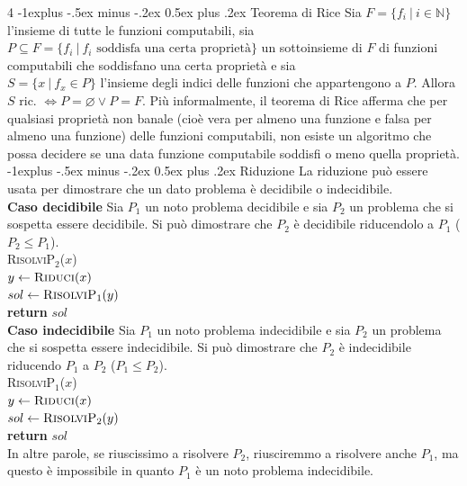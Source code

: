 \documentclass[10pt,landscape]{article}
\makeatletter
\renewcommand{\subsection}{\@startsection{subsection}{2}{0mm}%
                                {-1explus -.5ex minus -.2ex}%
                                {0.5ex plus .2ex}%
                                {\normalfont\large\bfseries}}
\makeatother
\begin{document}
\begin{multicols*}{4}
        \subsection{Teorema di Rice}
        Sia $F = \{f_i\ |\ i \in \mathbb{N}\}$ l'insieme di tutte le funzioni computabili, sia $P \subseteq F = \{f_i\ |\ f_i\text{ soddisfa una certa proprietà}\}$ un sottoinsieme di $F$ di funzioni computabili che soddisfano una certa proprietà e sia \\$S=\{x\ |\ f_x \in P\}$ l'insieme degli indici delle funzioni che appartengono a $P$. Allora $S$ ric. $\iff P = \varnothing \lor P = F$. Più informalmente, il teorema di Rice afferma che per qualsiasi proprietà non banale (cioè vera per almeno una funzione e falsa per almeno una funzione) delle funzioni computabili, non esiste un algoritmo che possa decidere se una data funzione computabile soddisfi o meno quella proprietà.
                \subsection{Riduzione}
                La riduzione può essere usata per dimostrare che un dato problema è decidibile o indecidibile.\\
                \textbf{Caso decidibile} Sia $P_1$ un noto problema decidibile e sia $P_2$ un problema che si sospetta essere decidibile. Si può dimostrare che $P_2$ è decidibile riducendolo a $P_1$ ($P_2 \le P_1$).\\[3pt]
                \textsc{RisolviP$_2$}($x$)\\
                \hspace*{1.5em}$y \leftarrow \textsc{Riduci}(x)$\\
                \hspace*{1.5em}$sol \leftarrow \textsc{RisolviP$_1$}(y)$\\
                \hspace*{1.5em}\textbf{return} $sol$\\[3pt]
                \textbf{Caso indecidibile} Sia $P_1$ un noto problema indecidibile e sia $P_2$ un problema che si sospetta essere indecidibile. Si può dimostrare che $P_2$ è indecidibile riducendo $P_1$ a $P_2$ ($P_1 \le P_2$).\\[3pt]
                \textsc{RisolviP$_1$}($x$)\\
                \hspace*{1.5em}$y \leftarrow \textsc{Riduci}(x)$\\
                \hspace*{1.5em}$sol \leftarrow \textsc{RisolviP$_2$}(y)$\\
                \hspace*{1.5em}\textbf{return} $sol$\\[3pt]
                In altre parole, se riuscissimo a risolvere $P_2$, riusciremmo a risolvere anche $P_1$, ma questo è impossibile in quanto $P_1$ è un noto problema indecidibile.

\end{multicols*}
\end{document}
